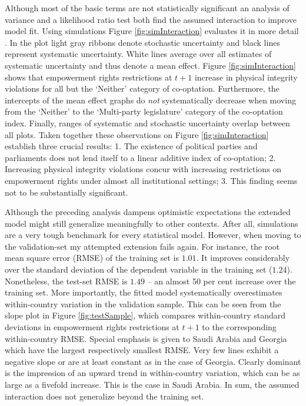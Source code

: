 Although most of the basic terms are not statistically 
significant an analysis of variance and a likelihood ratio 
test both find the assumed interaction to improve model fit.
Using simulations 
Figure \ref{fig:simInteraction} evaluates it in more detail 
\citep{KingGaryMichaelTomzWittenbergJason.2000}. In the plot 
light gray ribbons denote stochastic uncertainty and 
black lines represent systematic uncertainty. White lines 
average over all estimates of systematic uncertainty and thus
denote a mean effect. Figure \ref{fig:simInteraction} shows 
that empowerment rights restrictions at $t+1$ increase in 
physical integrity violations for all but the `Neither' 
category of co-optation. Furthermore, the intercepts of the 
mean effect graphs do \textit{not} systematically decrease 
when moving from the `Neither' to the `Multi-party 
legislature' category of the co-optation index. Finally, 
ranges of systematic and stochastic uncertainty overlap 
between all plots. Taken together these observations on
Figure \ref{fig:simInteraction} establish three crucial 
results: 1. The existence of political parties and 
parliaments does not lend itself to a linear additive index 
of co-optation; 2. Increasing physical integrity violations 
concur with increasing restrictions on empowerment rights 
under almost all institutional settings; 3. This finding 
seems not to be substantially significant.

Although the preceding analysis dampens optimistic 
expectations the extended model might still generalize 
meaningfully to other contexts. After all, 
simulations are a very tough benchmark for every statistical
model. However, when moving to the validation-set my 
attempted extension fails again. For instance, the root mean
square error (RMSE) of the training set is $1.01$. It  
improves considerably over the standard deviation of the 
dependent variable in the training set ($1.24$). 
Nonetheless, the test-set RMSE is $1.49$ -- an almost 50 
per cent increase over the training set. More importantly, 
the fitted model systematically overestimates within-country
variation in the validation sample. This can be seen from 
the slope plot in Figure \ref{fig:testSample}, which 
compares within-country standard deviations in empowerment 
rights restrictions at $t+1$ to the corresponding 
within-country RMSE. Special emphasis is given to Saudi 
Arabia and Georgia which have the largest respectively 
smallest RMSE. Very few lines exhibit a negative slope or 
are at least constant as in the case of Georgia. Clearly 
dominant is the impression of an upward trend in 
within-country variation, which can be as large as a 
fivefold increase. This is the case in Saudi Arabia. In sum,
the assumed interaction does not generalize beyond the 
training set.

